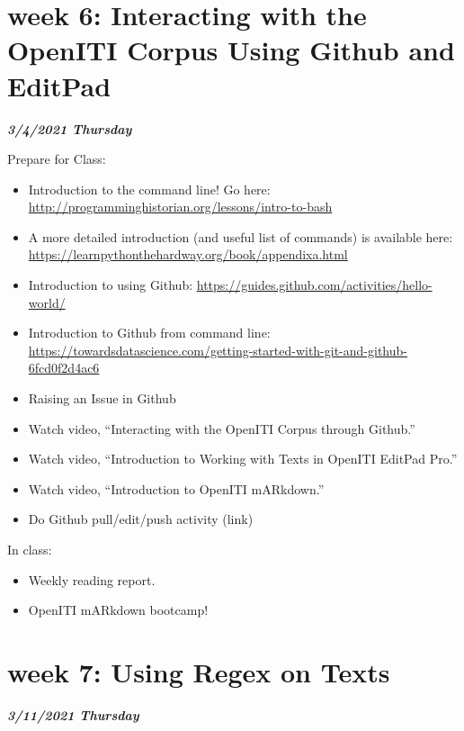 \documentclass[
]{book}
\providecommand{\tightlist}{%
  \setlength{\itemsep}{0pt}\setlength{\parskip}{0pt}}
\begin{document}
\hypertarget{week-6-interacting-with-the-openiti-corpus-using-github-and-editpad-1}{%
\chapter{week 6: Interacting with the OpenITI Corpus Using Github and EditPad}\label{week-6-interacting-with-the-openiti-corpus-using-github-and-editpad-1}}

\textbf{\emph{3/4/2021 Thursday}}

Prepare for Class:

\begin{itemize}
\tightlist
\item
  Introduction to the command line! Go here: \url{http://programminghistorian.org/lessons/intro-to-bash}
\item
  A more detailed introduction (and useful list of commands) is available here: \url{https://learnpythonthehardway.org/book/appendixa.html}
\item
  Introduction to using Github: \url{https://guides.github.com/activities/hello-world/}
\item
  Introduction to Github from command line: \url{https://towardsdatascience.com/getting-started-with-git-and-github-6fcd0f2d4ac6}
\item
  Raising an Issue in Github
\item
  Watch video, ``Interacting with the OpenITI Corpus through Github.''
\item
  Watch video, ``Introduction to Working with Texts in OpenITI EditPad Pro.''
\item
  Watch video, ``Introduction to OpenITI mARkdown.''
\item
  Do Github pull/edit/push activity (link)
\end{itemize}

In class:

\begin{itemize}
\tightlist
\item
  Weekly reading report.
\item
  OpenITI mARkdown bootcamp!
\end{itemize}

\hypertarget{week-7-using-regex-on-texts-1}{%
\chapter{week 7: Using Regex on Texts}\label{week-7-using-regex-on-texts-1}}

\textbf{\emph{3/11/2021 Thursday}}
\end{document}

